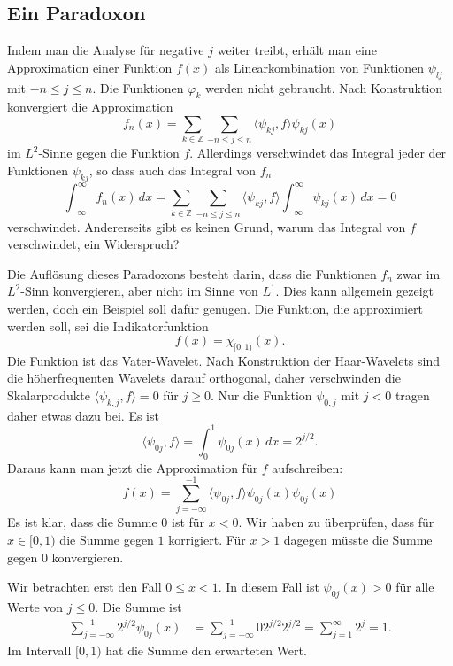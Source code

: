 \subsection{Ein Paradoxon}
Indem man die Analyse für negative $j$ weiter treibt, erhält man
eine Approximation einer Funktion $f(x)$ als Linearkombination von
Funktionen $\psi_{lj}$ mit $-n\le j\le n$.
Die Funktionen $\varphi_k$ werden nicht gebraucht.
Nach Konstruktion konvergiert die Approximation
\[
f_n(x)
=
\sum_{k\in\mathbb Z}\sum_{-n\le j\le n} \langle\psi_{kj},f\rangle \psi_{kj}(x)
\]
im $L^2$-Sinne gegen die Funktion $f$.
Allerdings verschwindet das Integral jeder der Funktionen $\psi_{kj}$,
so dass auch das Integral von $f_n$
\[
\int_{-\infty}^\infty f_n(x)\,dx
=
\sum_{k\in\mathbb Z}\sum_{-n\le j\le n} \langle\psi_{kj},f\rangle
\int_{-\infty}^\infty \psi_{kj}(x)\,dx
=
0
\]
verschwindet.
Andererseits gibt es keinen Grund, warum das Integral von $f$ verschwindet,
ein Widerspruch?

Die Auflösung dieses Paradoxons besteht darin, dass die Funktionen
$f_n$ zwar im $L^2$-Sinn konvergieren, aber nicht im Sinne von $L^1$.
Dies kann allgemein gezeigt werden, doch ein Beispiel soll dafür genügen.
Die Funktion, die approximiert werden soll, sei die Indikatorfunktion
\[
f(x) = \chi_{[0,1)}(x).
\]
Die Funktion ist das Vater-Wavelet.
Nach Konstruktion der Haar-Wavelets sind die höherfrequenten Wavelets
darauf orthogonal, daher verschwinden die Skalarprodukte
$\langle \psi_{k,j},f\rangle=0$ für $j\ge 0$.
Nur die Funktion $\psi_{0,j}$ mit $j<0$ tragen daher etwas dazu bei.
Es ist
\[
\langle \psi_{0j},f\rangle
=
\int_0^1 \psi_{0j}(x)\,dx
=
2^{j/2}.
\]
Daraus kann man jetzt die Approximation für $f$ aufschreiben:
\[
f(x)
=
\sum_{j=-\infty}^{-1} \langle \psi_{0j},f\rangle \psi_{0j}(x)
\psi_{0j}(x)
\]
Es ist klar, dass die Summe $0$ ist für $x<0$.
Wir haben zu überprüfen, dass für $x\in[0,1)$ die Summe gegen $1$ 
korrigiert. 
Für $x>1$ dagegen müsste die Summe gegen $0$ konvergieren.

Wir betrachten erst den Fall $0\le x < 1$.
In diesem Fall ist $\psi_{0j}(x)>0$ für alle Werte von $j\le 0$.
Die Summe ist
\begin{align*}
\sum_{j=-\infty}^{-1} 2^{j/2} \psi_{0j}(x)
&=
\sum_{j=-\infty}^{-1}0 2^{j/2} 2^{j/2}
=
\sum_{j=1}^\infty 2^j = 1.
\end{align*}
Im Intervall $[0,1)$ hat die Summe den erwarteten Wert.

